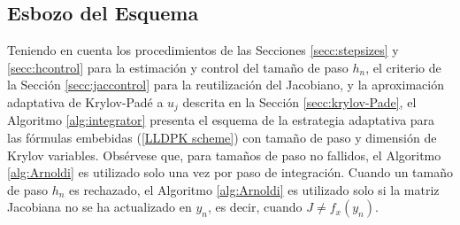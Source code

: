 \subsection{Esbozo del Esquema}

Teniendo en cuenta los procedimientos de las Secciones \ref{secc:stepsizes} y \ref{secc:hcontrol} para la estimación y control del tamaño de paso $h_n$, el criterio de la Sección \ref{secc:jaccontrol} para la reutilización del Jacobiano, y la aproximación adaptativa de Krylov-Padé a $u_j$ descrita en la Sección \ref{secc:krylov-Pade}, el Algoritmo \ref{alg:integrator} presenta el esquema de la estrategia adaptativa para las fórmulas embebidas  (\ref{LLDPK scheme}) con tamaño de paso y dimensión de  Krylov variables. Obsérvese que, para tamaños de paso no fallidos, el Algoritmo \ref{alg:Arnoldi} es utilizado solo una vez por paso de integración. Cuando un tamaño de paso $h_n$ es rechazado, el Algoritmo \ref{alg:Arnoldi} es utilizado solo si la matriz Jacobiana no se ha actualizado en $y_n$, es decir, cuando $J \neq f_x(y_n)$.


